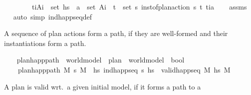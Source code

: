 \begin{isabellebody}
\ \ \ \ \ \ \ \ {\isachardoublequoteopen}{\isasymlbrakk}{\isacharparenleft}{\kern0pt}t\isactrlsub i{\isacharcomma}{\kern0pt}A\isactrlsub i{\isacharparenright}{\kern0pt}\ {\isasymin}\ set\ hs\ {\isacharsemicolon}{\kern0pt}\ a\ {\isasymin}\ set\ A\isactrlsub i{\isasymrbrakk}\ {\isasymLongrightarrow}\ {\isasymexists}{\isacharparenleft}{\kern0pt}t\isactrlsub {\isasympi}{\isacharcomma}{\kern0pt}{\isasympi}{\isacharparenright}{\kern0pt}\ {\isasymin}\ set\ {\isasympi}s{\isachardot}{\kern0pt}\ inst{\isacharunderscore}{\kern0pt}of{\isacharunderscore}{\kern0pt}plan{\isacharunderscore}{\kern0pt}action\ {\isasympi}s\ {\isacharparenleft}{\kern0pt}t\isactrlsub {\isasympi}{\isacharcomma}{\kern0pt}{\isasympi}{\isacharparenright}{\kern0pt}\ {\isacharparenleft}{\kern0pt}t\isactrlsub i{\isacharcomma}{\kern0pt}a{\isacharparenright}{\kern0pt}{\isachardoublequoteclose}\isanewline
%
\isadelimproof
\ \ %
\endisadelimproof
%
\isatagproof
{}\isamarkupfalse%
\ assms\isanewline
\ \ \isamarkupfalse%
{\isacharparenleft}{\kern0pt}auto\ simp{\isacharcolon}{\kern0pt}\ ind{\isacharunderscore}{\kern0pt}happ{\isacharunderscore}{\kern0pt}seq{\isacharunderscore}{\kern0pt}def{\isacharparenright}{\kern0pt}%
\endisatagproof
{\isafoldproof}%
%
\isadelimproof
%
\endisadelimproof
%
\begin{isamarkuptext}%
A sequence of plan actions form a path, if they are well-formed and
    their instantiations form a path.%
\end{isamarkuptext}\isamarkuptrue%
\ \ \isamarkupfalse%
\ plan{\isacharunderscore}{\kern0pt}happ{\isacharunderscore}{\kern0pt}path\ {\isacharcolon}{\kern0pt}{\isacharcolon}{\kern0pt}\ {\isachardoublequoteopen}world{\isacharunderscore}{\kern0pt}model\ {\isasymRightarrow}\ plan\ {\isasymRightarrow}\ world{\isacharunderscore}{\kern0pt}model\ {\isasymRightarrow}\ bool{\isachardoublequoteclose}\ \isanewline
\ \ \ \ {\isachardoublequoteopen}plan{\isacharunderscore}{\kern0pt}happ{\isacharunderscore}{\kern0pt}path\ M\ {\isasympi}s\ M{\isacharprime}{\kern0pt}\ {\isasymlongleftrightarrow}\ {\isacharparenleft}{\kern0pt}{\isasymexists}hs{\isachardot}{\kern0pt}\ ind{\isacharunderscore}{\kern0pt}happ{\isacharunderscore}{\kern0pt}seq\ {\isasympi}s\ hs\ {\isasymand}\ valid{\isacharunderscore}{\kern0pt}happ{\isacharunderscore}{\kern0pt}seq\ M\ hs\ M{\isacharprime}{\kern0pt}{\isacharparenright}{\kern0pt}{\isachardoublequoteclose}%
\begin{isamarkuptext}%
A plan is valid wrt.\ a given initial model, if it forms a path to a

\end{isamarkuptext}
\end{isabellebody}
